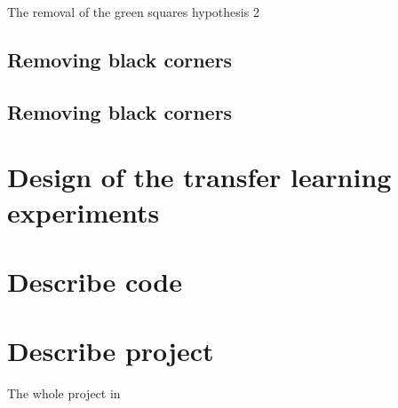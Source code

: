 The removal of the green squares  hypothesis 2




\subsection{Removing black corners}
\subsection{Removing black corners}

\section{Design of the transfer learning experiments}

 
\section{Describe code}
    
\section{Describe project}
    
    The whole project in 
